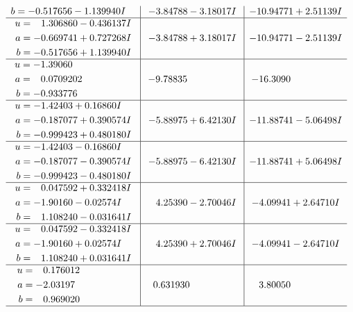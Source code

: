 \documentclass[1p]{elsarticle_modified}
\theoremstyle{definition}
\begin{document}
$$\begin{array}{c|c|c}
\begin{aligned}
b &= -0.517656 - 1.139940 I\end{aligned}
 & -3.84788 - 3.18017 I & -10.94771 + 2.51139 I \\ \hline\begin{aligned}
u &= \phantom{-}1.306860 - 0.436137 I \\
a &= -0.669741 + 0.727268 I \\
b &= -0.517656 + 1.139940 I\end{aligned}
 & -3.84788 + 3.18017 I & -10.94771 - 2.51139 I \\ \hline\begin{aligned}
u &= -1.39060\phantom{ +0.000000I} \\
a &= \phantom{-}0.0709202\phantom{ +0.000000I} \\
b &= -0.933776\phantom{ +0.000000I}\end{aligned}
 & -9.78835\phantom{ +0.000000I} & -16.3090\phantom{ +0.000000I} \\ \hline\begin{aligned}
u &= -1.42403 + 0.16860 I \\
a &= -0.187077 + 0.390574 I \\
b &= -0.999423 + 0.480180 I\end{aligned}
 & -5.88975 + 6.42130 I & -11.88741 - 5.06498 I \\ \hline\begin{aligned}
u &= -1.42403 - 0.16860 I \\
a &= -0.187077 - 0.390574 I \\
b &= -0.999423 - 0.480180 I\end{aligned}
 & -5.88975 - 6.42130 I & -11.88741 + 5.06498 I \\ \hline\begin{aligned}
u &= \phantom{-}0.047592 + 0.332418 I \\
a &= -1.90160 - 0.02574 I \\
b &= \phantom{-}1.108240 - 0.031641 I\end{aligned}
 & \phantom{-}4.25390 - 2.70046 I & -4.09941 + 2.64710 I \\ \hline\begin{aligned}
u &= \phantom{-}0.047592 - 0.332418 I \\
a &= -1.90160 + 0.02574 I \\
b &= \phantom{-}1.108240 + 0.031641 I\end{aligned}
 & \phantom{-}4.25390 + 2.70046 I & -4.09941 - 2.64710 I \\ \hline\begin{aligned}
u &= \phantom{-}0.176012\phantom{ +0.000000I} \\
a &= -2.03197\phantom{ +0.000000I} \\
b &= \phantom{-}0.969020\phantom{ +0.000000I}\end{aligned}
 & \phantom{-}0.631930\phantom{ +0.000000I} & \phantom{-}3.80050\phantom{ +0.000000I}\\
 \hline 
 \end{array}$$\newpage
\end{document}
